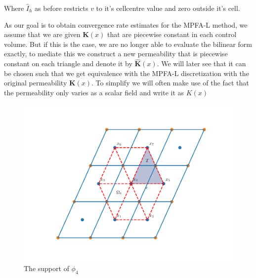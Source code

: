 \documentclass[../Main/main.tex]{subfiles}
\begin{document}
	Where $\hat{I}_h$ as before restricts $v$ to it's cellcentre value and zero outside it's cell.
	\par
	As our goal is to obtain convergence rate estimates for the MPFA-L method, we assume that we are given $\pmb{K}(x)$ that are piecewise constant in each control volume. But if this is the case, we are no longer able to evaluate the bilinear form exactly, to mediate this we construct a new permeability that is piecewise constant on each triangle and denote it by $\pmb{\hat{K}}(x)$. We will later see that it can be chosen such that we get equivalence with the MPFA-L discretization with the original permeability $\pmb{K}(x)$. To simplify we will often make use of the fact that the permeability only varies as a scalar field and write it as $K(x)$
	\begin{figure}[H]\label{fig:control volume}
		\centering
		\includegraphics[width=1\textwidth]{Control volume.pdf}
		\caption{The support of $\phi_4$}
	\end{figure}
\end{document}
